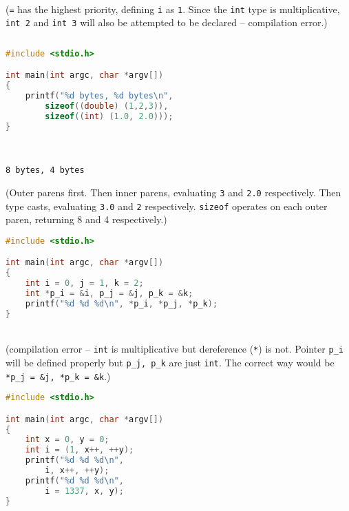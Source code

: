 \begin{exmp}
\begin{multicols}{2}
\columnbreak
\; \\

(\texttt{=} has the highest priority, defining \texttt{i} as \texttt{1}. Since the \texttt{int} type is multiplicative, \texttt{int 2} and \texttt{int 3} will also be attempted to be declared -- compilation error.)
\begin{verbatim}
\end{verbatim}
\end{multicols}


\begin{multicols}{2}
\begin{lstlisting}[language=c]
#include <stdio.h>

int main(int argc, char *argv[])
{
	printf("%d bytes, %d bytes\n",
	    sizeof((double) (1,2,3)),
	    sizeof((int) (1.0, 2.0)));
}
\end{lstlisting}
\columnbreak

\; \\
\begin{verbatim}
8 bytes, 4 bytes
\end{verbatim}
(Outer parens first. Then inner parens, evaluating \texttt{3} and \texttt{2.0} respectively. Then type casts, evaluating \texttt{3.0} and \texttt{2} respectively. \texttt{sizeof} operates on each outer paren, returning 8 and 4 respectively.)

\end{multicols}




\begin{multicols}{2}

\begin{lstlisting}[language=c]
#include <stdio.h>

int main(int argc, char *argv[])
{
	int i = 0, j = 1, k = 2;
	int *p_i = &i, p_j = &j, p_k = &k;
	printf("%d %d %d\n", *p_i, *p_j, *p_k);
}
\end{lstlisting}
\columnbreak
\; \\
(compilation error -- \texttt{int} is multiplicative but dereference (\texttt{*}) is not. Pointer \texttt{p\_i} will be defined properly but \texttt{p\_j, p\_k} are just \texttt{int}. The correct way would be \texttt{*p\_j = \&j, *p\_k = \&k}.)
\end{multicols}

\clearpage
\begin{multicols}{2}
\begin{lstlisting}[language=c]
#include <stdio.h>

int main(int argc, char *argv[])
{
	int x = 0, y = 0;
	int i = (1, x++, ++y);
	printf("%d %d %d\n",
	    i, x++, ++y);
	printf("%d %d %d\n",
	    i = 1337, x, y);
}
\end{lstlisting}


\end{multicols}
\end{exmp}
